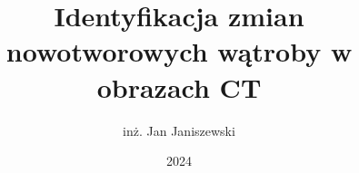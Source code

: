 \documentclass[thesis=msc,faculty=ee]{EE-dyplom}
\title{Identyfikacja zmian nowotworowych wątroby w obrazach CT}
\author{inż. Jan Janiszewski}
\date{2024}
\begin{document}
    \frontpages

    

    \bibliografia

    
    \listoffigures
    \listoftables
\end{document}
